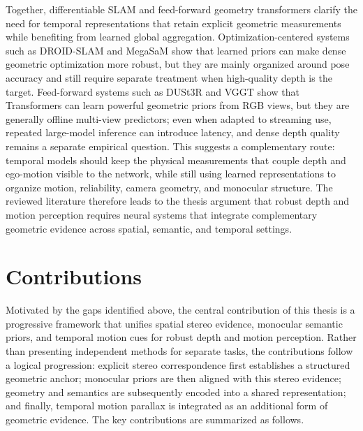 Together, differentiable SLAM and feed-forward geometry transformers clarify the need for temporal representations that retain explicit geometric measurements while benefiting from learned global aggregation.
Optimization-centered systems such as DROID-SLAM and MegaSaM show that learned priors can make dense geometric optimization more robust, but they are mainly organized around pose accuracy and still require separate treatment when high-quality depth is the target.
Feed-forward systems such as DUSt3R and VGGT show that Transformers can learn powerful geometric priors from RGB views, but they are generally offline multi-view predictors; even when adapted to streaming use, repeated large-model inference can introduce latency, and dense depth quality remains a separate empirical question.
This suggests a complementary route: temporal models should keep the physical measurements that couple depth and ego-motion visible to the network, while still using learned representations to organize motion, reliability, camera geometry, and monocular structure.
The reviewed literature therefore leads to the thesis argument that robust depth and motion perception requires neural systems that integrate complementary geometric evidence across spatial, semantic, and temporal settings.

\section{Contributions}
Motivated by the gaps identified above, the central contribution of this thesis is a progressive framework that unifies spatial stereo evidence, monocular semantic priors, and temporal motion cues for robust depth and motion perception.
Rather than presenting independent methods for separate tasks, the contributions follow a logical progression: explicit stereo correspondence first establishes a structured geometric anchor; monocular priors are then aligned with this stereo evidence; geometry and semantics are subsequently encoded into a shared representation;  and finally, temporal motion parallax is integrated as an additional form of geometric evidence.
The key contributions are summarized as follows.

